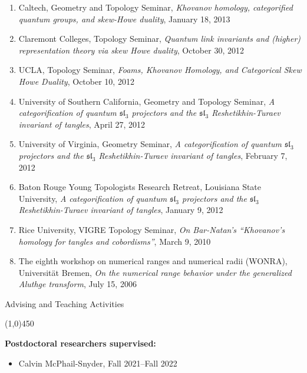 \documentclass[10pt]{article}
\begin{document}
\begin{enumerate}
\item Caltech, Geometry and Topology Seminar, 
\emph{Khovanov homology, categorified quantum groups, 
and skew-Howe duality}, January 18, 2013

\item Claremont Colleges, Topology Seminar, 
\emph{Quantum link invariants and (higher) representation theory 
via skew Howe duality}, October 30, 2012

\item UCLA, Topology Seminar, 
\emph{Foams, Khovanov Homology, and Categorical Skew Howe Duality}, 
October 10, 2012

\item University of Southern California, Geometry and Topology Seminar, 
\emph{A categorification of quantum $\mathfrak{sl}_3$ projectors 
and the $\mathfrak{sl}_3$ Reshetikhin-Turaev invariant of tangles}, April 27, 2012

\item University of Virginia, Geometry Seminar, 
\emph{A categorification of quantum $\mathfrak{sl}_3$ projectors 
and the $\mathfrak{sl}_3$ Reshetikhin-Turaev invariant of tangles}, February 7, 2012

\item Baton Rouge Young Topologists Research Retreat, Louisiana State University, 
\emph{A categorification of quantum $\mathfrak{sl}_3$ projectors 
and the $\mathfrak{sl}_3$ Reshetikhin-Turaev invariant of tangles}, January 9, 2012

\item Rice University, VIGRE Topology Seminar, 
\emph{On Bar-Natan's ``Khovanov's homology for tangles and cobordisms''}, March 9, 2010

\item The eighth workshop on numerical ranges and numerical radii (WONRA), 
Universit\"{a}t Bremen, 
\emph{On the numerical range behavior under the generalized Aluthge transform}, 
July 15, 2006


\end{enumerate}




\bigskip
\noindent
{\large \sc Advising and Teaching Activities}

\vspace{-0.1in}
\noindent
\line(1,0){450}

\smallskip
\noindent\textbf{Postdoctoral researchers supervised:}
\begin{itemize}

\item Calvin McPhail-Snyder, Fall 2021--Fall 2022

\end{itemize}
\end{document}
